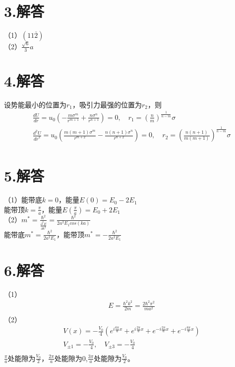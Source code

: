 \documentclass[UTF8]{ctexart}
\begin{document}
\section*{\bfseries 3.解答}
（1）$(11\overline{2})$\\
（2）$\frac{\sqrt{6}}{3}a$\\
\section*{\bfseries 4.解答}
设势能最小的位置为$r_1$，吸引力最强的位置为$r_2$，则
\begin{equation*}
    \begin{aligned}
        & \frac{dU}{dr}=u_0(-\frac{m\sigma^m}{r^{m+1}}+\frac{n\sigma^n}{r^{n+1}})=0,\quad
        r_1=(\frac{n}{m})^\frac{1}{n-m}\sigma\\
        & \frac{d^2U}{{dr}^2}=u_0(\frac{m(m+1)\sigma^m}{r^{m+2}}-\frac{n(n+1)\sigma^n}{r^{n+2}})=0,\quad
        r_2=(\frac{n(n+1)}{m(m+1)})^\frac{1}{n-m}\sigma\\
    \end{aligned}
\end{equation*}
\section*{\bfseries 5.解答}
（1）能带底$k=0$，能量$E(0)=E_0-2E_1$\\
能带顶$k=\frac{\pi}{a}$，能量$E(\frac{\pi}{a})=E_0+2E_1$\\
（2）$m^*=\frac{\hbar^2}{\frac{\partial^2E}{\partial k^2}}=\frac{\hbar^2}{2a^2E_1cos(ka)}$\\
能带底$m^*=\frac{\hbar^2}{2a^2E_1}$，能带顶$m^*=-\frac{\hbar^2}{2a^2E_1}$\\
\section*{\bfseries 6.解答}
（1）
\begin{equation*}
    \begin{aligned}
        & E=\frac{\hbar^2k^2}{2m}=\frac{2\hbar^2\pi^2}{ma^2}\\
    \end{aligned}
\end{equation*}
（2）
\begin{equation*}
    \begin{aligned}
        & V(x)=-\frac{V_0}{4}(e^{i\frac{6\pi}{a}x}+e^{i\frac{2\pi}{a}x}+e^{-i\frac{2\pi}{a}x}+e^{-i\frac{6\pi}{a}x})\\
        & V_{\pm1}=-\frac{V_0}{4},\quad V_{\pm3}=-\frac{V_0}{4}\\
    \end{aligned}
\end{equation*}
$\frac{\pi}{a}$处能隙为$\frac{V_0}{2}$，$\frac{2\pi}{a}$处能隙为$0$,$\frac{3\pi}{a}$处能隙为$\frac{V_0}{2}$。
\end{document}
